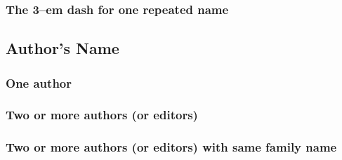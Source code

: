 \documentclass[11pt,letterpaper,oneside]{article}
\begin{document}
\setcounter{subsubsection}{67}
\subsubsection{The 3–em dash for one repeated name}

\begin{bibonly}
\nocite{judt1996,judt2008,judt1989,squire1983,squire1987}
\end{bibonly}

\setcounter{subsection}{2}
\subsection{Author's Name}
\setcounter{subsection}{14}

\setcounter{subsubsection}{74}
\subsubsection{One author}

\begin{citebib}
\item \cite[33]{shields2013}
\item \cite[677]{chun2015}
\item \cite[5]{mccune2014}
\item \cite[100--101]{shields2013}
\item \cite[681]{chun2015}
\item \cite[105--11]{mccune2014}
\end{citebib}

\subsubsection{Two or more authors (or editors)}
\label{14.76}

\begin{citebib}
\item \cite[xvi]{sorrells2015}
\item \cite[20--21]{levitt2005}
\item \cite[422]{umbers2015}
\item \cite[xx-xxi]{sorrells2015}
\item \cite[158]{gmuca2015}
\item \cite[160]{gmuca2015}
\end{citebib}

\subsubsection{Two or more authors (or editors) with same family name}
\end{document}
